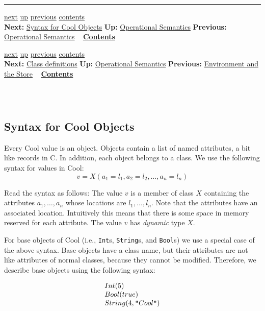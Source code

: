 \documentclass[]{article}
\begin{document}
\begin{center}\rule{3in}{0.4pt}\end{center}

\href{node46.html}{next} \href{node44.html}{up}
\href{node44.html}{previous} \href{node1.html}{contents} \\
\textbf{Next:} \href{node46.html}{Syntax for Cool Objects} \textbf{Up:}
\href{node44.html}{Operational Semantics} \textbf{Previous:}
\href{node44.html}{Operational Semantics} ~
\textbf{\href{node1.html}{Contents}}

\href{node47.html}{next} \href{node44.html}{up}
\href{node45.html}{previous} \href{node1.html}{contents} \\
\textbf{Next:} \href{node47.html}{Class definitions} \textbf{Up:}
\href{node44.html}{Operational Semantics} \textbf{Previous:}
\href{node45.html}{Environment and the Store} ~
\textbf{\href{node1.html}{Contents}} \\ \\

\subsection{\\ Syntax for Cool Objects}

Every Cool value is an object. Objects contain a list of named
attributes, a bit like records in C. In addition, each object belongs to
a class. We use the following syntax for values in Cool: \\

\begin{displaymath}
v = X(a_1=l_1,a_2=l_2,\ldots,a_n=l_n)
\end{displaymath}

Read the syntax as follows: The value $ v$ is a member of class $X$
containing the attributes $a_1, \ldots, a_n$ whose locations are
$l_1, \ldots, l_n$. Note that the attributes have an associated
location. Intuitively this means that there is some space in memory
reserved for each attribute. The value $ v$ has \emph{dynamic} type $X$.

For base objects of Cool (i.e., \texttt{Int}s, \texttt{String}s, and
\texttt{Bool}s) we use a special case of the above syntax. Base objects
have a class name, but their attributes are not like attributes of
normal classes, because they cannot be modified. Therefore, we describe
base objects using the following syntax:

\begin{displaymath}
\begin{array}{l}
Int(5)\\
Bool(true)\\
String(4,\mbox {\tt ''}Cool \mbox {\tt ''})
\end{array}\end{displaymath}
\end{document}
